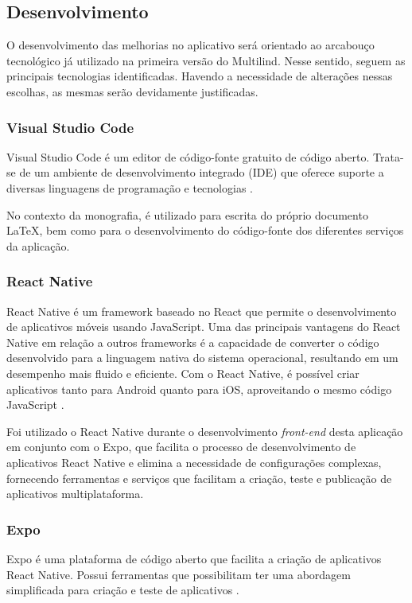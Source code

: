 \subsection{Desenvolvimento}
\label{sec:Desenvolvimento}
O desenvolvimento das melhorias no aplicativo será orientado ao arcabouço tecnológico já utilizado na primeira versão do Multilind. Nesse sentido, seguem as 
principais tecnologias identificadas. Havendo a necessidade de alterações nessas escolhas, as mesmas serão devidamente justificadas.

\subsubsection{Visual Studio Code}
\label{sec:Visual Studio Code}
Visual Studio Code é um editor de código-fonte gratuito de código aberto. Trata-se de um ambiente de desenvolvimento 
integrado (IDE) que oferece suporte a diversas linguagens de programação e tecnologias \cite{vscode}.

No contexto da monografia, é utilizado para escrita do próprio documento LaTeX, bem como para o desenvolvimento do código-fonte 
dos diferentes serviços da aplicação.

\subsubsection{React Native}
\label{sec:React Native}
React Native é um framework baseado no React que permite o desenvolvimento de aplicativos móveis usando JavaScript. Uma das 
principais vantagens do React Native em relação a outros frameworks é a capacidade de converter o código desenvolvido para a 
linguagem nativa do sistema operacional, resultando em um desempenho mais fluido e eficiente. Com o React Native, é possível 
criar aplicativos tanto para Android quanto para iOS, aproveitando o mesmo código JavaScript \cite{reactnative}.

Foi utilizado o React Native durante o desenvolvimento \textit{front-end} desta aplicação em conjunto com o Expo, que facilita 
o processo de desenvolvimento de aplicativos React Native e elimina a necessidade de configurações complexas, fornecendo ferramentas 
e serviços que facilitam a criação, teste e publicação de aplicativos multiplataforma.

\subsubsection{Expo}
\label{sec:Expo}
Expo é uma plataforma de código aberto que facilita a criação de aplicativos React Native. Possui ferramentas que  
possibilitam ter uma abordagem simplificada para criação e teste de aplicativos \cite{expo}.

